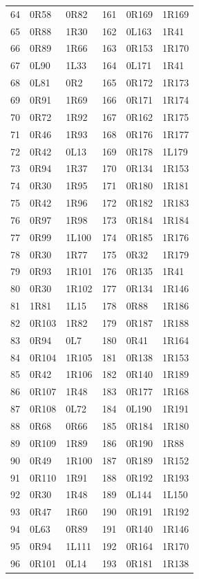 {\begin{longtable}{@{}rll@{\qquad}rll@{}}
64 & 0R58 & 0R82 & 161 & 0R169 & 1R169\\
65 & 0R88 & 1R30 & 162 & 0L163 & 1R41\\
66 & 0R89 & 1R66 & 163 & 0R153 & 1R170\\
67 & 0L90 & 1L33 & 164 & 0L171 & 1R41\\
68 & 0L81 & 0R2 & 165 & 0R172 & 1R173\\
69 & 0R91 & 1R69 & 166 & 0R171 & 1R174\\
70 & 0R72 & 1R92 & 167 & 0R162 & 1R175\\
71 & 0R46 & 1R93 & 168 & 0R176 & 1R177\\
72 & 0R42 & 0L13 & 169 & 0R178 & 1L179\\
73 & 0R94 & 1R37 & 170 & 0R134 & 1R153\\
74 & 0R30 & 1R95 & 171 & 0R180 & 1R181\\
75 & 0R42 & 1R96 & 172 & 0R182 & 1R183\\
76 & 0R97 & 1R98 & 173 & 0R184 & 1R184\\
77 & 0R99 & 1L100 & 174 & 0R185 & 1R176\\
78 & 0R30 & 1R77 & 175 & 0R32 & 1R179\\
79 & 0R93 & 1R101 & 176 & 0R135 & 1R41\\
80 & 0R30 & 1R102 & 177 & 0R134 & 1R146\\
81 & 1R81 & 1L15 & 178 & 0R88 & 1R186\\
82 & 0R103 & 1R82 & 179 & 0R187 & 1R188\\
83 & 0R94 & 0L7 & 180 & 0R41 & 1R164\\
84 & 0R104 & 1R105 & 181 & 0R138 & 1R153\\
85 & 0R42 & 1R106 & 182 & 0R140 & 1R189\\
86 & 0R107 & 1R48 & 183 & 0R177 & 1R168\\
87 & 0R108 & 0L72 & 184 & 0L190 & 1R191\\
88 & 0R68 & 0R66 & 185 & 0R184 & 1R180\\
89 & 0R109 & 1R89 & 186 & 0R190 & 1R88\\
90 & 0R49 & 1R100 & 187 & 0R189 & 1R152\\
91 & 0R110 & 1R91 & 188 & 0R192 & 1R193\\
92 & 0R30 & 1R48 & 189 & 0L144 & 1L150\\
93 & 0R47 & 1R60 & 190 & 0R191 & 1R192\\
94 & 0L63 & 0R89 & 191 & 0R140 & 1R146\\
95 & 0R94 & 1L111 & 192 & 0R164 & 1R170\\
96 & 0R101 & 0L14 & 193 & 0R181 & 1R138\\
\bottomrule
\end{longtable}
}
